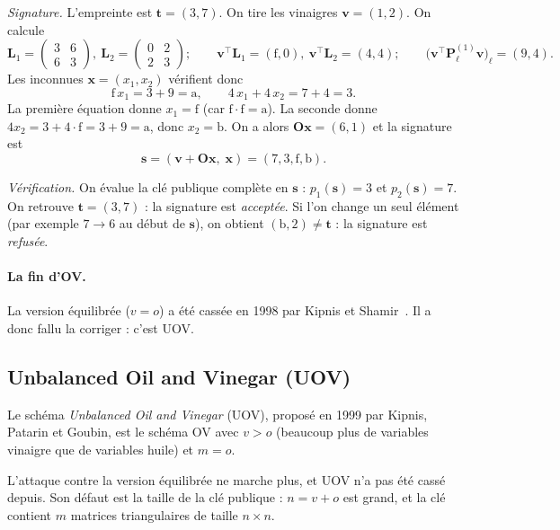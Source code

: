 \emph{Signature.} L'empreinte est $\mathbf{t}=(3,7)$. On tire les vinaigres $\mathbf{v}=(1,2)$. On calcule
\[\mathbf{L}_1=\begin{pmatrix}3&6\\6&3\end{pmatrix},\ \mathbf{L}_2=\begin{pmatrix}0&2\\2&3\end{pmatrix};\qquad \mathbf{v}^{\top}\mathbf{L}_1=(\mathrm{f},0),\ \mathbf{v}^{\top}\mathbf{L}_2=(4,4);\qquad \bigl(\mathbf{v}^{\top}\mathbf{P}^{(1)}_\ell\mathbf{v}\bigr)_\ell=(9,4).\]
Les inconnues $\mathbf{x}=(x_1,x_2)$ vérifient donc
\[\mathrm{f}\,x_1=3+9=\mathrm{a},\qquad 4\,x_1+4\,x_2=7+4=3.\]
La première équation donne $x_1=\mathrm{f}$ (car $\mathrm{f}\cdot\mathrm{f}=\mathrm{a}$). La seconde donne $4x_2=3+4\cdot\mathrm{f}=3+9=\mathrm{a}$, donc $x_2=\mathrm{b}$. On a alors $\mathbf{O}\mathbf{x}=(6,1)$ et la signature est
\[\mathbf{s}=(\mathbf{v}+\mathbf{O}\mathbf{x},\;\mathbf{x})=(7,3,\mathrm{f},\mathrm{b}).\]

\emph{Vérification.} On évalue la clé publique complète en $\mathbf{s}$ : $p_1(\mathbf{s})=3$ et $p_2(\mathbf{s})=7$. On retrouve $\mathbf{t}=(3,7)$ : la signature est \emph{acceptée}. Si l'on change un seul élément (par exemple $7\to6$ au début de $\mathbf{s}$), on obtient $(\mathrm{b},2)\neq\mathbf{t}$ : la signature est \emph{refusée}.

\paragraph{La fin d'OV.} La version équilibrée ($v=o$) a été cassée en 1998 par Kipnis et Shamir~\cite{kipnisshamir}. Il a donc fallu la corriger : c'est UOV.

\subsection{Unbalanced Oil and Vinegar (UOV)}
\begin{definition}
Le schéma \emph{Unbalanced Oil and Vinegar} (UOV), proposé en 1999 par Kipnis, Patarin et Goubin, est le schéma OV avec $v>o$ (beaucoup plus de variables vinaigre que de variables huile) et $m=o$.
\end{definition}
L'attaque contre la version équilibrée ne marche plus, et UOV n'a pas été cassé depuis. Son défaut est la taille de la clé publique : $n=v+o$ est grand, et la clé contient $m$ matrices triangulaires de taille $n\times n$.

